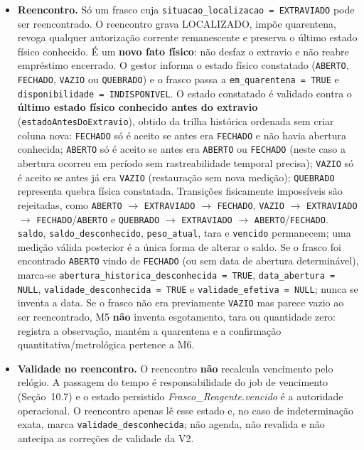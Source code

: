 \begin{regra}
\begin{itemize}
    \item \textbf{Reencontro.} Só um frasco cuja \texttt{situacao\_localizacao = EXTRAVIADO} pode ser reencontrado. O reencontro grava LOCALIZADO, impõe quarentena, revoga qualquer autorização corrente remanescente e preserva o último estado físico conhecido. É um \textbf{novo fato físico}: não desfaz o extravio e não reabre empréstimo encerrado. O gestor informa o estado físico constatado (\texttt{ABERTO}, \texttt{FECHADO}, \texttt{VAZIO} ou \texttt{QUEBRADO}) e o frasco passa a \texttt{em\_quarentena = TRUE} e \texttt{disponibilidade = INDISPONIVEL}. O estado constatado é validado contra o \textbf{último estado físico conhecido antes do extravio} (\texttt{estadoAntesDoExtravio}), obtido da trilha histórica ordenada sem criar coluna nova: \texttt{FECHADO} só é aceito se antes era \texttt{FECHADO} e não havia abertura conhecida; \texttt{ABERTO} só é aceito se antes era \texttt{ABERTO} ou \texttt{FECHADO} (neste caso a abertura ocorreu em período sem rastreabilidade temporal precisa); \texttt{VAZIO} só é aceito se antes já era \texttt{VAZIO} (restauração sem nova medição); \texttt{QUEBRADO} representa quebra física constatada. Transições fisicamente impossíveis são rejeitadas, como \texttt{ABERTO} $\rightarrow$ \texttt{EXTRAVIADO} $\rightarrow$ \texttt{FECHADO}, \texttt{VAZIO} $\rightarrow$ \texttt{EXTRAVIADO} $\rightarrow$ \texttt{FECHADO}/\texttt{ABERTO} e \texttt{QUEBRADO} $\rightarrow$ \texttt{EXTRAVIADO} $\rightarrow$ \texttt{ABERTO}/\texttt{FECHADO}. \texttt{saldo}, \texttt{saldo\_desconhecido}, \texttt{peso\_atual}, tara e \texttt{vencido} permanecem; uma medição válida posterior é a única forma de alterar o saldo. Se o frasco foi encontrado \texttt{ABERTO} vindo de \texttt{FECHADO} (ou sem data de abertura determinável), marca-se \texttt{abertura\_historica\_desconhecida = TRUE}, \texttt{data\_abertura = NULL}, \texttt{validade\_desconhecida = TRUE} e \texttt{validade\_efetiva = NULL}; nunca se inventa a data. Se o frasco não era previamente \texttt{VAZIO} mas parece vazio ao ser reencontrado, M5 \textbf{não} inventa esgotamento, tara ou quantidade zero: registra a observação, mantém a quarentena e a confirmação quantitativa/metrológica pertence a M6.
    \item \textbf{Validade no reencontro.} O reencontro \textbf{não} recalcula vencimento pelo relógio. A passagem do tempo é responsabilidade do job de vencimento (Seção~10.7) e o estado persistido \textit{Frasco\_Reagente.vencido} é a autoridade operacional. O reencontro apenas lê esse estado e, no caso de indeterminação exata, marca \texttt{validade\_desconhecida}; não agenda, não revalida e não antecipa as correções de validade da V2.

\end{itemize}
\end{regra}
